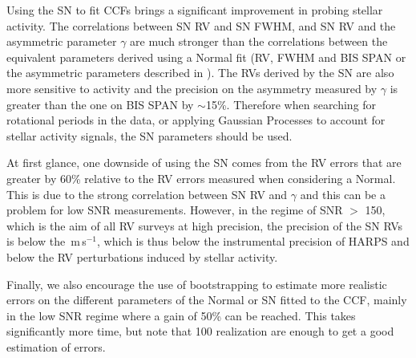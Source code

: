 \documentclass[11pt, oneside]{article}
\def\ms{\hbox{\,m\,s$^{-1}$}}         %
\begin{document}
Using the SN to fit CCFs brings a significant improvement in probing stellar activity. The correlations between SN RV and SN FWHM, and SN RV and the asymmetric parameter $\gamma$ are much stronger than the correlations between the equivalent parameters derived using a Normal fit (RV, FWHM and BIS SPAN or the asymmetric parameters described in \citet{Figueira-2013}). The RVs derived by the SN are also more sensitive to activity and the precision on the asymmetry measured by $\gamma$ is greater than the one on BIS SPAN by $\sim$15\%. Therefore when searching for rotational periods in the data, or applying Gaussian Processes to account for stellar activity signals, the SN parameters should be used.

At first glance, one downside of using the SN comes from the RV errors that are greater by 60\% relative to the RV errors measured when considering a Normal. This is due to the strong correlation between SN RV and $\gamma$ and this can be a problem for low SNR measurements. However, in the regime of SNR $>$ 150, which is the aim of all RV surveys at high precision, the precision of the SN RVs is below the \ms, which is thus below the instrumental precision of HARPS and below the RV perturbations induced by stellar activity.

Finally, we also encourage the use of bootstrapping to estimate more realistic errors on the different parameters of the Normal or SN fitted to the CCF, mainly in the low SNR regime where a gain of 50\% can be reached. This takes significantly more time, but note that 100 realization are enough to get a good estimation of errors.


\end{document}
